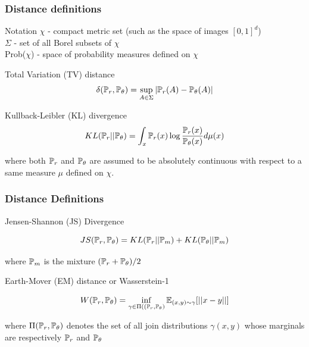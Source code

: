 \documentclass{beamer}
\begin{document}
\begin{frame}
\frametitle{Distance definitions}

\pause
\begin{block}{Notation}
$\chi$ - compact metric set (such as the space of images $[0,1]^d$)\\
$\Sigma$ - set of all Borel subsets of $\chi$ \\
Prob($\chi$) - space of probability measures defined on $\chi$\\
\end{block}

\pause
\begin{block}{Total Variation (TV) distance}
\vspace{-5pt}
$$ \delta(\P_{r}, \P_{\theta}) = \sup_{A \in \Sigma} |\P_{r}(A) - \P_{\theta} (A)| $$
\vspace{-5pt}
\end{block}
\pause
\begin{block}{Kullback-Leibler (KL) divergence}
\vspace{-5pt}
$$ KL(\P_{r}||\P_{\theta}) = \int_{x} \P_{r}(x) \log\frac{\P_{r}(x)}{\P_{\theta}(x)} d\mu(x) $$

where both $\P_{r}$ and $\P_{\theta}$ are assumed to be absolutely continuous with respect to a same measure $\mu$ defined on $\chi$. 

\end{block}

\end{frame}

\begin{frame}
\frametitle{Distance Definitions}

\pause
\begin{block}{Jensen-Shannon (JS) Divergence}

$$ JS(\P_{r}, \P_{\theta}) = KL(\P_{r}||\P_{m}) + KL(\P_{\theta}||\P_{m}) $$

where $\P_{m}$ is the mixture $(\P_{r} + \P_{\theta})/2$ 
\end{block}
\pause
\begin{block}{Earth-Mover (EM) distance or Wasserstein-1}

$$ W(\P_{r},\P_{\theta}) = \inf_{\gamma \in \Pi((\P_{r},\P_{\theta})} \E_{(x,y) \sim \gamma} [ ||x-y|| ] $$

where $\Pi(\P_{r},\P_{\theta})$ denotes the set of all join distributions $\gamma(x,y)$ whose marginals are respectively $\P_{r}$ and $\P_{\theta}$\\
\vspace{2.5pt}
\end{block}

\end{frame}
\end{document}
